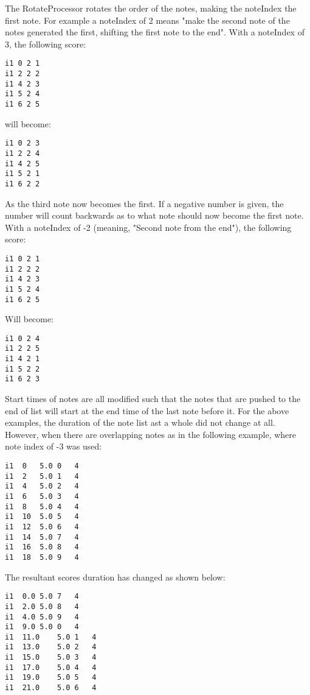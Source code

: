 The RotateProcessor rotates the order of the notes, making the noteIndex
the first note. For example a noteIndex of 2 means "make the second note
of the notes generated the first, shifting the first note to the end".
With a noteIndex of 3, the following score:

\begin{verbatim}
i1 0 2 1
i1 2 2 2
i1 4 2 3
i1 5 2 4
i1 6 2 5
\end{verbatim}

will become:

\begin{verbatim}
i1 0 2 3
i1 2 2 4
i1 4 2 5
i1 5 2 1
i1 6 2 2
\end{verbatim}

As the third note now becomes the first. If a negative number is given,
the number will count backwards as to what note should now become the
first note. With a noteIndex of -2 (meaning, "Second note from the
end"), the following score:

\begin{verbatim}
i1 0 2 1
i1 2 2 2
i1 4 2 3
i1 5 2 4
i1 6 2 5
\end{verbatim}

Will become:

\begin{verbatim}
i1 0 2 4
i1 2 2 5
i1 4 2 1
i1 5 2 2
i1 6 2 3
\end{verbatim}

Start times of notes are all modified such that the notes that are
pushed to the end of list will start at the end time of the last note
before it. For the above examples, the duration of the note list ast a
whole did not change at all. However, when there are overlapping notes
as in the following example, where note index of -3 was used:

\begin{verbatim}
i1  0   5.0 0   4   
i1  2   5.0 1   4   
i1  4   5.0 2   4   
i1  6   5.0 3   4   
i1  8   5.0 4   4   
i1  10  5.0 5   4   
i1  12  5.0 6   4   
i1  14  5.0 7   4   
i1  16  5.0 8   4   
i1  18  5.0 9   4   
\end{verbatim}

The resultant scores duration has changed as shown below:

\begin{verbatim}
i1  0.0 5.0 7   4   
i1  2.0 5.0 8   4   
i1  4.0 5.0 9   4   
i1  9.0 5.0 0   4   
i1  11.0    5.0 1   4   
i1  13.0    5.0 2   4   
i1  15.0    5.0 3   4   
i1  17.0    5.0 4   4   
i1  19.0    5.0 5   4   
i1  21.0    5.0 6   4   
\end{verbatim}

